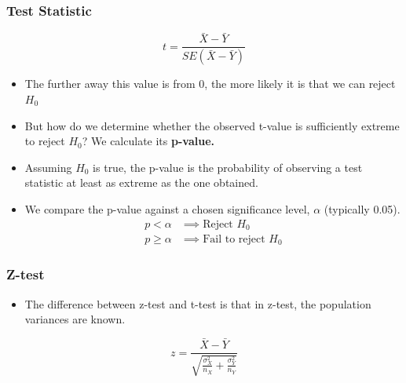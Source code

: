 \documentclass{beamer}
\begin{document}
\begin{frame}[t]
\frametitle{Test Statistic}
\[
\boxed{
t=\frac{\bar X-\bar Y}{SE(\bar X-\bar Y)}
}
\]

\begin{itemize}
    \item The further away this value is from 0, the more likely it is that we can reject $H_{0}$
    \vspace{0.3em}
    \item But how do we determine whether the observed t-value is sufficiently extreme to reject \(H_0\)? We calculate its \textbf{p-value.}
    \vspace{0.3em}
    \item Assuming \(H_0\) is true, the p-value is the probability of observing a test statistic at least as extreme as the one obtained.
    \vspace{0.3em}
    \item We compare the p-value against a chosen significance level, \(\alpha\) (typically 0.05).
    \vspace{0.3em} \[
\boxed{
\begin{aligned}
p<\alpha &\implies \text{Reject }H_0\\
p\geq\alpha &\implies \text{Fail to reject }H_0
\end{aligned}
}
\]
\end{itemize}
    
\end{frame}


\begin{frame}[t]
\frametitle{Z-test}
\begin{itemize}
    \item The difference between z-test and t-test is that in z-test, the population variances are known.
\end{itemize}
\vspace{0.5em}
\[
\boxed{z=\frac{\bar X-\bar Y}{\sqrt{\frac{\sigma_X^2}{n_X}+\frac{\sigma_Y^2}{n_Y}}}}
\]
\end{frame}


\end{document}
